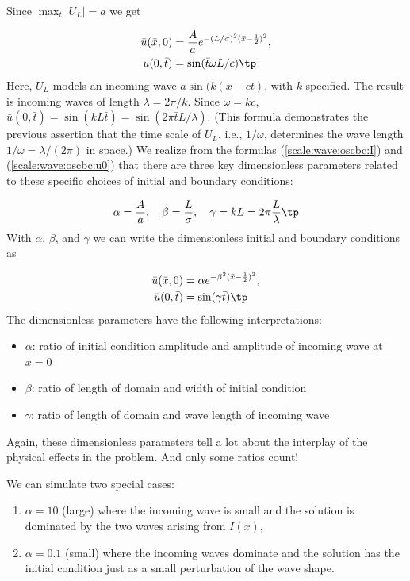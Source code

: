 \documentclass[graybox,envcountchap,sectrefs,final]{svmonodo}
\begin{document}
Since $\max_t |U_L|=a$ we get

\begin{align}
\bar u(\bar x,0) &= \frac{A}{a}e^{-(L/\sigma)^2(\bar x -\frac{1}{2})^2},
\label{scale:wave:oscbc:I}\\ 
\bar u(0,\bar t) &= \sin(\bar t\omega L/c)\tp
\label{scale:wave:oscbc:u0}
\end{align}
Here, $U_L$ models an incoming wave $a\sin(k(x-ct)$, with $k$ specified.
The result is incoming
waves of length $\lambda = 2\pi/k$. Since $\omega =kc$,
$\bar u(0,\bar t)=\sin(kL\bar t) = \sin(2\pi\bar t L/\lambda)$.
(This formula demonstrates the previous assertion that the time scale
of $U_L$, i.e., $1/\omega$, determines the wave length $1/\omega = \lambda/(2\pi)$ in space.)
We realize from the formulas (\ref{scale:wave:oscbc:I}) and
(\ref{scale:wave:oscbc:u0})
that there are three key dimensionless parameters related
to these specific choices of initial and boundary conditions:

\[ \alpha = \frac{A}{a},\quad\beta = \frac{L}{\sigma},\quad\gamma = kL
=2\pi\frac{L}{\lambda}\tp\]
With $\alpha$, $\beta$, and $\gamma$ we can write the dimensionless
initial and boundary conditions as

\begin{align*}
\bar u(\bar x,0) &= \alpha e^{-\beta^2(\bar x -\frac{1}{2})^2},\\ 
\bar u(0,\bar t) &= \sin(\gamma\bar t)\tp
\end{align*}
The dimensionless parameters have the following interpretations:

\begin{itemize}
 \item $\alpha$: ratio of initial condition amplitude and amplitude of incoming wave
   at $x=0$

 \item $\beta$: ratio of length of domain and width of initial condition

 \item $\gamma$: ratio of length of domain and wave length of incoming wave
\end{itemize}

\noindent
Again, these dimensionless parameters tell a lot about the interplay of
the physical effects in the problem. And only some ratios count!

We can simulate two special cases:

\begin{enumerate}
\item $\alpha=10$ (large) where the
   incoming wave is small and the solution is dominated by the two waves
   arising from $I(x)$,

\item $\alpha=0.1$ (small) where the incoming waves
   dominate and the solution has the initial condition just
   as a small perturbation of the wave shape.
\end{enumerate}
\end{document}
